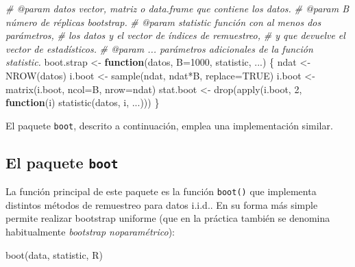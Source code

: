 \documentclass[
]{book}
\newenvironment{Shaded}{\begin{snugshade}}{\end{snugshade}}
\newcommand{\AttributeTok}[1]{\textcolor[rgb]{0.77,0.63,0.00}{#1}}
\newcommand{\CommentTok}[1]{\textcolor[rgb]{0.56,0.35,0.01}{\textit{#1}}}
\newcommand{\ConstantTok}[1]{\textcolor[rgb]{0.00,0.00,0.00}{#1}}
\newcommand{\ControlFlowTok}[1]{\textcolor[rgb]{0.13,0.29,0.53}{\textbf{#1}}}
\newcommand{\DecValTok}[1]{\textcolor[rgb]{0.00,0.00,0.81}{#1}}
\newcommand{\FunctionTok}[1]{\textcolor[rgb]{0.00,0.00,0.00}{#1}}
\newcommand{\NormalTok}[1]{#1}
\newcommand{\OtherTok}[1]{\textcolor[rgb]{0.56,0.35,0.01}{#1}}
\newcommand{\SpecialCharTok}[1]{\textcolor[rgb]{0.00,0.00,0.00}{#1}}
\theoremstyle{break}
\theoremstyle{definition}
\theoremstyle{definition}
\theoremstyle{definition}
\theoremstyle{definition}
\theoremstyle{remark}
\begin{document}
\begin{Shaded}
\begin{Highlighting}[]
\CommentTok{\#\textquotesingle{} @param datos vector, matriz o data.frame que contiene los datos.}
\CommentTok{\#\textquotesingle{} @param B número de réplicas bootstrap.}
\CommentTok{\#\textquotesingle{} @param statistic función con al menos dos parámetros, }
\CommentTok{\#\textquotesingle{} los datos y el vector de índices de remuestreo, }
\CommentTok{\#\textquotesingle{} y que devuelve el vector de estadísticos.}
\CommentTok{\#\textquotesingle{} @param ... parámetros adicionales de la función statistic.}
\NormalTok{boot.strap }\OtherTok{\textless{}{-}} \ControlFlowTok{function}\NormalTok{(datos, }\AttributeTok{B=}\DecValTok{1000}\NormalTok{, statistic, ...) \{}
\NormalTok{  ndat }\OtherTok{\textless{}{-}} \FunctionTok{NROW}\NormalTok{(datos)}
\NormalTok{  i.boot }\OtherTok{\textless{}{-}} \FunctionTok{sample}\NormalTok{(ndat, ndat}\SpecialCharTok{*}\NormalTok{B, }\AttributeTok{replace=}\ConstantTok{TRUE}\NormalTok{)}
\NormalTok{  i.boot }\OtherTok{\textless{}{-}} \FunctionTok{matrix}\NormalTok{(i.boot, }\AttributeTok{ncol=}\NormalTok{B, }\AttributeTok{nrow=}\NormalTok{ndat)}
\NormalTok{  stat.boot }\OtherTok{\textless{}{-}} \FunctionTok{drop}\NormalTok{(}\FunctionTok{apply}\NormalTok{(i.boot, }\DecValTok{2}\NormalTok{, }\ControlFlowTok{function}\NormalTok{(i) }\FunctionTok{statistic}\NormalTok{(datos, i, ...)))}
\NormalTok{\}}
\end{Highlighting}
\end{Shaded}

El paquete \texttt{boot}, descrito a continuación, emplea una implementación similar.

\hypertarget{intro-pkgboot}{%
\subsection{\texorpdfstring{El paquete \texttt{boot}}{El paquete boot}}\label{intro-pkgboot}}

La función principal de este paquete es la función \texttt{boot()} que implementa distintos métodos de remuestreo para datos i.i.d..
En su forma más simple permite realizar bootstrap uniforme (que en la práctica también se denomina habitualmente \emph{bootstrap noparamétrico}):

\begin{Shaded}
\begin{Highlighting}[]
\FunctionTok{boot}\NormalTok{(data, statistic, R)}
\end{Highlighting}
\end{Shaded}
\end{document}
